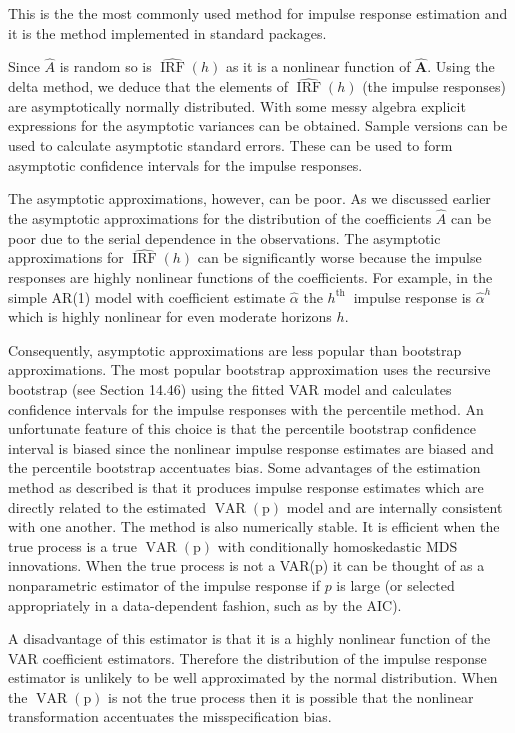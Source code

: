 \documentclass[10pt]{article}
\begin{document}
This is the the most commonly used method for impulse response estimation and it is the method implemented in standard packages.

Since $\widehat{A}$ is random so is $\widehat{\operatorname{IRF}}(h)$ as it is a nonlinear function of $\widehat{\boldsymbol{A}}$. Using the delta method, we deduce that the elements of $\widehat{\operatorname{IRF}}(h)$ (the impulse responses) are asymptotically normally distributed. With some messy algebra explicit expressions for the asymptotic variances can be obtained. Sample versions can be used to calculate asymptotic standard errors. These can be used to form asymptotic confidence intervals for the impulse responses.

The asymptotic approximations, however, can be poor. As we discussed earlier the asymptotic approximations for the distribution of the coefficients $\widehat{A}$ can be poor due to the serial dependence in the observations. The asymptotic approximations for $\widehat{\operatorname{IRF}}(h)$ can be significantly worse because the impulse responses are highly nonlinear functions of the coefficients. For example, in the simple AR(1) model with coefficient estimate $\widehat{\alpha}$ the $h^{\text {th }}$ impulse response is $\widehat{\alpha}^{h}$ which is highly nonlinear for even moderate horizons $h$.

Consequently, asymptotic approximations are less popular than bootstrap approximations. The most popular bootstrap approximation uses the recursive bootstrap (see Section 14.46) using the fitted VAR model and calculates confidence intervals for the impulse responses with the percentile method. An unfortunate feature of this choice is that the percentile bootstrap confidence interval is biased since the nonlinear impulse response estimates are biased and the percentile bootstrap accentuates bias. Some advantages of the estimation method as described is that it produces impulse response estimates which are directly related to the estimated $\operatorname{VAR}(\mathrm{p})$ model and are internally consistent with one another. The method is also numerically stable. It is efficient when the true process is a true $\operatorname{VAR}(\mathrm{p})$ with conditionally homoskedastic MDS innovations. When the true process is not a VAR(p) it can be thought of as a nonparametric estimator of the impulse response if $p$ is large (or selected appropriately in a data-dependent fashion, such as by the AIC).

A disadvantage of this estimator is that it is a highly nonlinear function of the VAR coefficient estimators. Therefore the distribution of the impulse response estimator is unlikely to be well approximated by the normal distribution. When the $\operatorname{VAR}(\mathrm{p})$ is not the true process then it is possible that the nonlinear transformation accentuates the misspecification bias.
\end{document}
